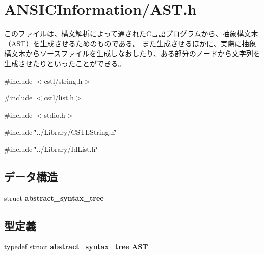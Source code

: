 \section{ANSICInformation/AST.h}
\label{AST_8h}


このファイルは、構文解析によって通されたC言語プログラムから、抽象構文木（AST）を生成させるためのものである。 また生成させるほかに、実際に抽象構文木からソースファイルを生成しなおしたり、ある部分のノードから文字列を生成させたりといったことができる。  


{\ttfamily \#include $<$cstl/string.h$>$}\par
{\ttfamily \#include $<$cstl/list.h$>$}\par
{\ttfamily \#include $<$stdio.h$>$}\par
{\ttfamily \#include \char`\"{}../Library/CSTLString.h\char`\"{}}\par
{\ttfamily \#include \char`\"{}../Library/IdList.h\char`\"{}}\par
\subsection*{データ構造}
\begin{DoxyCompactItemize}
\item 
struct {\bf abstract\_\-syntax\_\-tree}
\end{DoxyCompactItemize}
\subsection*{型定義}
\begin{DoxyCompactItemize}
\item 
typedef struct {\bf abstract\_\-syntax\_\-tree} {\bf AST}
\end{DoxyCompactItemize}
